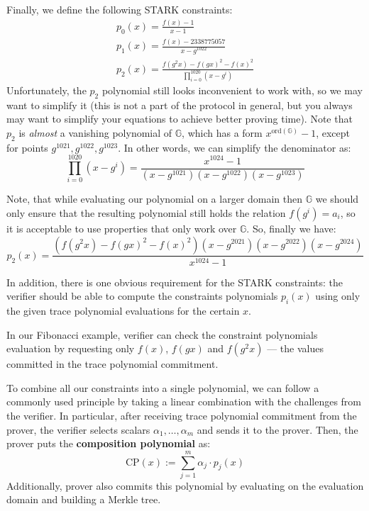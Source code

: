\documentclass[../lecture-notes.tex]{subfiles}
\begin{document}
\begin{example}
Finally, we define the following STARK constraints:
\begin{gather*}
    p_0(x) = \frac{f(x)-1}{x - 1} \\
    p_1(x) = \frac{f(x) - 2338775057}{x - g^{1022}} \\
    p_2(x) = \frac{f(g^2x) - f(gx)^2 - f(x)^2}{\prod_{i=0}^{1020} (x - g^i)}
\end{gather*}
Unfortunately, the $p_2$ polynomial still looks inconvenient to work with, so we
may want to simplify it (this is not a part of the protocol in general, but you
always may want to simplify your equations to achieve better proving time). Note
that $p_2$ is \textit{almost} a vanishing polynomial of $\mathbb{G}$, which has
a form $x^{\text{ord}(\mathbb{G})} - 1$, except for points $g^{1021},
g^{1022}, g^{1023}$. In other words, we can simplify the denominator as:
\begin{equation*}
    \prod_{i=0}^{1020} (x - g^i) = \frac{x^{1024} - 1}{(x-g^{1021})(x-g^{1022})(x-g^{1023})}
\end{equation*}

Note, that while evaluating our polynomial on a larger domain
then $\mathbb{G}$ we should only ensure that the resulting polynomial still
holds the relation $f(g^i) = a_i$, so it is acceptable to use properties that
only work over $\mathbb{G}$. So, finally we have:
\begin{equation*}
p_2(x) = \frac{(f(g^2x) - f(gx)^2 - f(x)^2)(x - g^{2021})(x - g^{2022})(x - g^{2024})}{x^{1024} - 1}  
\end{equation*}
\end{example}

In addition, there is one obvious requirement for the STARK constraints: the
verifier should be able to compute the constraints polynomials $p_i(x)$ using
only the given trace polynomial evaluations for the certain $x$.

\begin{remark}
In our Fibonacci example, verifier can check the constraint polynomials
evaluation by requesting only $f(x)$, $f(gx)$ and $f(g^2x)$ --- the values
committed in the trace polynomial commitment.
\end{remark}

To combine all our constraints into a single polynomial, we can follow a
commonly used principle by taking a linear combination with the challenges from
the verifier. In particular, after receiving trace polynomial commitment from
the prover, the verifier selects scalars $\alpha_1,\dots,\alpha_m$ and sends it
to the prover. Then, the prover puts the \textbf{composition polynomial} as:
\begin{equation*}
\text{CP}(x) := \sum_{j = 1}^m \alpha_j\cdot p_j(x)
\end{equation*}
Additionally, prover also commits this polynomial by evaluating on the evaluation domain and building a Merkle tree.
\end{document}

